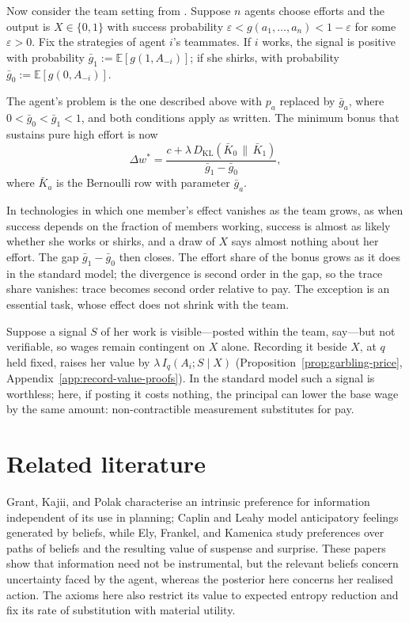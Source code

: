 \documentclass[11pt,a4paper]{article}
\theoremstyle{definition}
\newcommand{\E}{\mathbb E}
\newcommand{\I}{I}
\newcommand{\KL}{D_{\mathrm{KL}}}
\newcommand{\1}{\mathbf 1}
\begin{document}
Now consider the team setting from \cite{Holmstrom1982}. Suppose $n$ agents choose efforts and the output is $X\in\{0,1\}$  with success probability $\varepsilon < g(a_1,\ldots,a_n) < 1-\varepsilon$ for some $\varepsilon>0$. Fix the
strategies of agent $i$'s teammates.  If $i$ works, the signal is positive with probability
$\bar g_1:=\E[g(1,A_{-i})]$; if she shirks, with probability $\bar g_0:=\E[g(0,A_{-i})]$.  

The agent's problem is the one described above with $p_a$ replaced by $\bar g_a$, where $0<\bar g_0<\bar g_1<1$, and both conditions apply as
written.  The minimum bonus that sustains pure high effort is now
\[
 \Delta w^*=\frac{c+\lambda\,\KL(\bar K_0\,\|\,\bar K_1)}{\bar g_1-\bar g_0},
\]
where $\bar K_a$ is the Bernoulli row with parameter $\bar g_a$.

In technologies in which one member's effect vanishes as the team grows, as when success depends on the
fraction of members working, success is almost as likely whether she works or shirks, and a draw of $X$
says almost nothing about her effort.
The gap $\bar g_1-\bar g_0$ then closes.  The effort share of the bonus grows as it does in the standard
model; the divergence is second order in the gap, so the trace share vanishes: trace becomes second order
relative to pay.  The exception is an essential task, whose effect does not shrink with the team.  

Suppose a signal $S$ of her work is visible---posted within the team, say---but not verifiable, so wages
remain contingent on $X$ alone.  Recording it beside $X$, at $q$ held fixed, raises her value by
$\lambda\,\I_q(A_i;S\mid X)$ (Proposition~\ref{prop:garbling-price}, Appendix~\ref{app:record-value-proofs}).
In the standard model such a signal is worthless; here, if posting it costs nothing, the principal can lower
the base wage by the same amount: non-contractible measurement substitutes for pay.


\section{Related literature}\label{sec:literature}

Grant, Kajii, and Polak \cite{GrantKajiiPolak1998} characterise an intrinsic preference for information
independent of its use in planning; Caplin and Leahy \cite{CaplinLeahy2001} model anticipatory feelings generated
by beliefs, while Ely, Frankel, and Kamenica \cite{ElyFrankelKamenica2015} study preferences over paths of beliefs
and the resulting value of suspense and surprise.  These papers show that information need not be instrumental,
but the relevant beliefs concern uncertainty faced by the agent, whereas the posterior here concerns her
realised action.  The axioms here also restrict its value to expected entropy reduction and fix its rate of
substitution with material utility.
\end{document}
